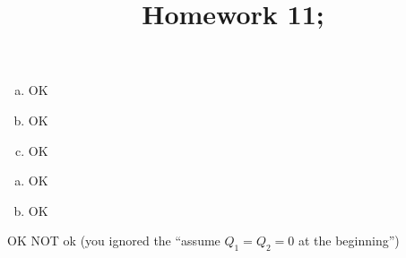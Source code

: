 \documentclass[10pt]{article} %
\title{Homework 11;
}
\begin{document}
\maketitle
{}
\begin{enumerate}[(a)]
	\item OK
	\item OK
	\item OK
\end{enumerate}
\begin{enumerate}[(a)]
	\item OK
	\item OK
\end{enumerate}
OK
NOT ok (you ignored the ``assume $Q_1=Q_2=0$ at the beginning'')
\end{document}
